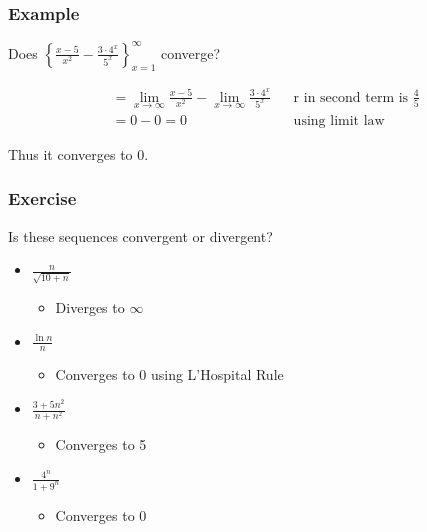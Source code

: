 \documentclass[t]{beamer}
\theoremstyle{plain}
\theoremstyle{definition}
\newcommand{\limm}[1]{\displaystyle \lim_{x\to #1}}
\begin{document}
\begin{frame}

\frametitle{Example}

Does $\left\{   \frac{x-5}{x^2} - \frac{3 \cdot 4^x}{5^x}  \right\}_{x=1}^{\infty}$ converge?

\begin{align*}
&= \limm{\infty} \frac{x - 5}{x^2} - \limm{\infty} \frac{3 \cdot 4^x}{5^x} && \text{r in second term is } \frac{4}{5}\\
&= 0 - 0 = 0 && \text{using limit law}
\end{align*}

Thus it converges to 0.

\end{frame}


\begin{frame}

\frametitle{Exercise}

Is these sequences convergent or divergent?

\begin{itemize}
	\item $\frac{n}{\sqrt{10 + n}}$  %
	\begin{itemize}
		\item Diverges to $\infty$
	\end{itemize}
	\item $\frac{\ln {n}}{n}$
	\begin{itemize}
		\item Converges to 0 using L'Hospital Rule %
	\end{itemize}
	\item $\frac{3 + 5n^2}{n + n^2}$ %
	\begin{itemize}
		\item Converges to 5
	\end{itemize}
	\item $\frac{4^n}{1 + 9^n}$  %
	\begin{itemize}
		\item Converges to 0
	\end{itemize}
\end{itemize}

\end{frame}
\end{document}
